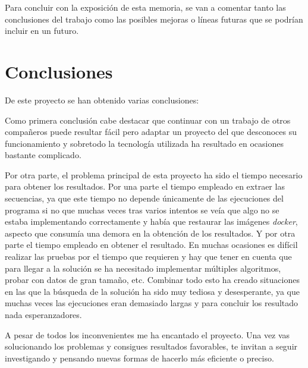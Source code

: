 Para concluir con la exposición de esta memoria, se van a comentar tanto las conclusiones del trabajo como las posibles mejoras o líneas futuras que se podrían incluir en un futuro. 

\section{Conclusiones}

De este proyecto se han obtenido varias conclusiones:

Como primera conclusión cabe destacar que continuar con un trabajo de otros compañeros puede resultar fácil pero adaptar un proyecto del que desconoces su funcionamiento y sobretodo la tecnología utilizada ha resultado en ocasiones bastante complicado. 

Por otra parte, el problema principal de esta proyecto ha sido el tiempo necesario para obtener los resultados. Por una parte el tiempo empleado en extraer las secuencias, ya que este tiempo no depende únicamente de las ejecuciones del programa si no que muchas veces tras varios intentos se veía que algo no se estaba implementando correctamente y había que restaurar las imágenes \textit{docker}, aspecto que consumía una demora en la obtención de los resultados. Y por otra parte el tiempo empleado en obtener el resultado. En muchas ocasiones es difícil realizar las pruebas por el tiempo que requieren y hay que tener en cuenta que para llegar a la solución se ha necesitado implementar múltiples algoritmos, probar con datos de gran tamaño, etc. Combinar todo esto ha creado situaciones en las que la búsqueda de la solución ha sido muy tediosa y desesperante, ya que muchas veces las ejecuciones eran demasiado largas y para concluir los resultado nada esperanzadores.

A pesar de todos los inconvenientes me ha encantado el proyecto. Una vez vas solucionando los problemas y consigues resultados favorables, te invitan a seguir investigando y pensando nuevas formas de hacerlo más eficiente o preciso.


